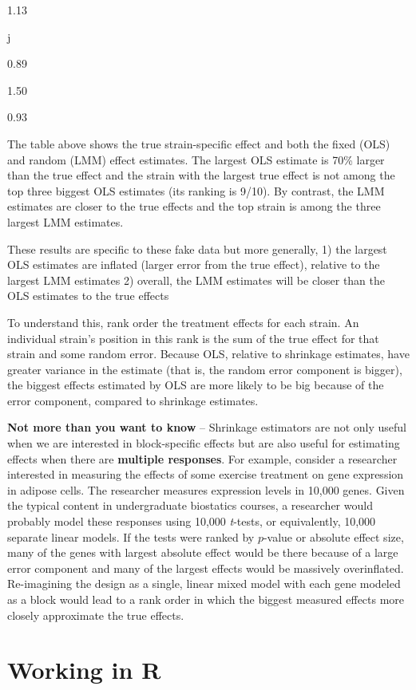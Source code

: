 \documentclass[]{book}
\begin{document}
1.13

j

0.89

1.50

0.93

The table above shows the true strain-specific effect and both the fixed
(OLS) and random (LMM) effect estimates. The largest OLS estimate is
70\% larger than the true effect and the strain with the largest true
effect is not among the top three biggest OLS estimates (its ranking is
9/10). By contrast, the LMM estimates are closer to the true effects and
the top strain is among the three largest LMM estimates.

These results are specific to these fake data but more generally, 1) the
largest OLS estimates are inflated (larger error from the true effect),
relative to the largest LMM estimates 2) overall, the LMM estimates will
be closer than the OLS estimates to the true effects

To understand this, rank order the treatment effects for each strain. An
individual strain's position in this rank is the sum of the true effect
for that strain and some random error. Because OLS, relative to
shrinkage estimates, have greater variance in the estimate (that is, the
random error component is bigger), the biggest effects estimated by OLS
are more likely to be big because of the error component, compared to
shrinkage estimates.

\textbf{Not more than you want to know} -- Shrinkage estimators are not
only useful when we are interested in block-specific effects but are
also useful for estimating effects when there are \textbf{multiple
responses}. For example, consider a researcher interested in measuring
the effects of some exercise treatment on gene expression in adipose
cells. The researcher measures expression levels in 10,000 genes. Given
the typical content in undergraduate biostatics courses, a researcher
would probably model these responses using 10,000 \emph{t}-tests, or
equivalently, 10,000 separate linear models. If the tests were ranked by
\(p\)-value or absolute effect size, many of the genes with largest
absolute effect would be there because of a large error component and
many of the largest effects would be massively overinflated.
Re-imagining the design as a single, linear mixed model with each gene
modeled as a block would lead to a rank order in which the biggest
measured effects more closely approximate the true effects.

\section{Working in R}\label{working-in-r-6}
\end{document}
